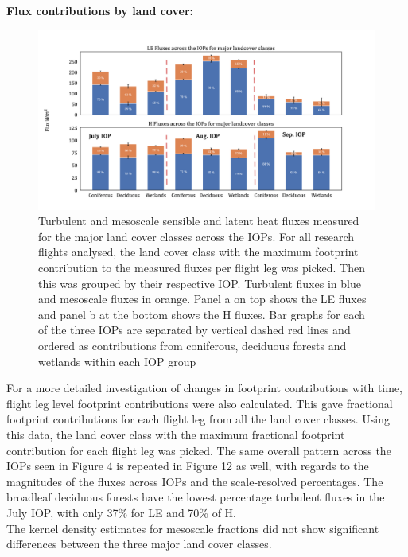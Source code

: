 \documentclass[draft]{agujournal2019}
\begin{document}
\textbf{Flux contributions by land cover:}

 \begin{figure}[hbtp]
 \noindent\includegraphics[width=\textwidth]{figures_main/footprint_IOP.png}
\caption{ Turbulent and mesoscale sensible and latent heat fluxes measured for the major land cover classes across the IOPs. For all research flights analysed, the land cover class with the maximum footprint contribution to the measured fluxes per flight leg was picked. Then this was grouped by their respective IOP. Turbulent fluxes in blue and mesoscale fluxes in orange. Panel a on top shows the LE fluxes and panel b at the bottom shows the H fluxes. Bar graphs for each of the three IOPs are separated by vertical dashed red lines and ordered as  contributions from coniferous, deciduous forests and wetlands within each IOP group }
\label{fig:footprint_IOP}
 \end{figure}
 
For a more detailed investigation of changes in footprint contributions with time, flight leg level footprint contributions were also calculated. This gave fractional footprint contributions for each flight leg from all the land cover classes. Using this data, the land cover class with the maximum fractional footprint contribution for each flight leg was picked. The same overall pattern across the IOPs seen in Figure 4 is repeated in Figure 12 as well, with regards to the magnitudes of the fluxes across IOPs and the scale-resolved percentages. The broadleaf deciduous forests have the lowest percentage turbulent fluxes in the July IOP, with only 37\% for LE and 70\% of H. \\
The kernel density estimates for mesoscale fractions did not show significant differences between the three major land cover classes.

\newpage
\end{document}
